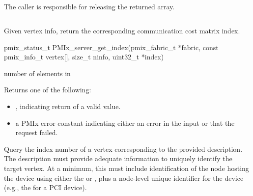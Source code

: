 The caller is responsible for releasing the returned array.



\subsection{}

\summary

Given vertex info, return the corresponding communication cost matrix index.

\format

\cspecificstart
\begin{codepar}
pmix_status_t
PMIx_server_get_index(pmix_fabric_t *fabric,
                      const pmix_info_t vertex[], size_t ninfo,
                      uint32_t *index)
\end{codepar}
\cspecificend

\begin{arglist}
 number of elements in 
\end{arglist}

Returns one of the following:

\begin{itemize}
    \item {}, indicating return of a valid value.
    \item a \ac{PMIx} error constant indicating either an error in the input or that the request failed.
\end{itemize}


\descr

Query the index number of a vertex corresponding to the provided description. The description must provide adequate information to uniquely identify the target vertex. At a minimum, this must include identification of the node hosting the device using either the  or , plus a node-level unique identifier for the device (e.g., the  for a \ac{PCI} device).


